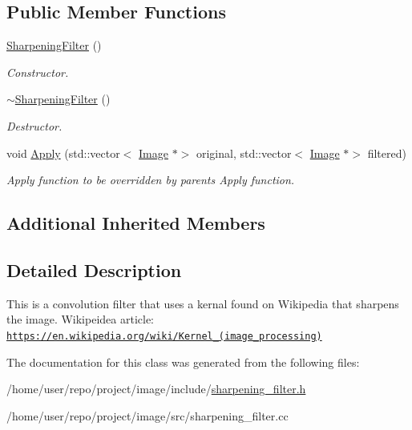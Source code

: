 \subsection*{Public Member Functions}
\begin{DoxyCompactItemize}
\item 
\mbox{\label{classSharpeningFilter_aa568777e139264384578b01231d2a6c1}} 
\hyperlink{classSharpeningFilter_aa568777e139264384578b01231d2a6c1}{Sharpening\+Filter} ()
\begin{DoxyCompactList}\small\item\em Constructor. \end{DoxyCompactList}\item 
\mbox{\label{classSharpeningFilter_af245f6418a3a1ce8f63a59da7916060d}} 
\hyperlink{classSharpeningFilter_af245f6418a3a1ce8f63a59da7916060d}{$\sim$\+Sharpening\+Filter} ()
\begin{DoxyCompactList}\small\item\em Destructor. \end{DoxyCompactList}\item 
\mbox{\label{classSharpeningFilter_a90a3aa50432079a57016e29b93eaa48b}} 
void \hyperlink{classSharpeningFilter_a90a3aa50432079a57016e29b93eaa48b}{Apply} (std\+::vector$<$ \hyperlink{classImage}{Image} $\ast$$>$ original, std\+::vector$<$ \hyperlink{classImage}{Image} $\ast$$>$ filtered)
\begin{DoxyCompactList}\small\item\em Apply function to be overridden by parents Apply function. \end{DoxyCompactList}\end{DoxyCompactItemize}
\subsection*{Additional Inherited Members}


\subsection{Detailed Description}
This is a convolution filter that uses a kernal found on Wikipedia that sharpens the image. Wikipeidea article\+: \href{https://en.wikipedia.org/wiki/Kernel_(image_processing)}{\tt https\+://en.\+wikipedia.\+org/wiki/\+Kernel\+\_\+(image\+\_\+processing)} 

The documentation for this class was generated from the following files\+:\begin{DoxyCompactItemize}
\item 
/home/user/repo/project/image/include/\hyperlink{sharpening__filter_8h}{sharpening\+\_\+filter.\+h}\item 
/home/user/repo/project/image/src/sharpening\+\_\+filter.\+cc\end{DoxyCompactItemize}

